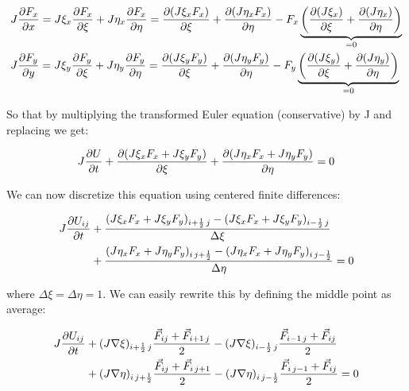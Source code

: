 \begin{equation}
\begin{aligned}
&J\frac{\partial F_x}{\partial x} = J\xi _x\frac{\partial F_x}{\partial \xi} + J\eta _x\frac{\partial F_x}{\partial \eta} = \frac{\partial (J\xi _x F_x)}{\partial \xi} + \frac{\partial (J\eta _xF_x)}{\partial \eta} - F_x\underbrace{ \left( \frac{\partial (J\xi _x)}{\partial \xi} + \frac{\partial (J\eta _x)}{\partial \eta} \right)}_{=0}
\\
&J\frac{\partial F_y}{\partial y} = J\xi _y\frac{\partial F_y}{\partial \xi} + J\eta _y\frac{\partial F_y}{\partial \eta} = \frac{\partial (J\xi _y F_y)}{\partial \xi} + \frac{\partial (J\eta _yF_y)}{\partial \eta} - F_y\underbrace{ \left( \frac{\partial (J\xi _y)}{\partial \xi} + \frac{\partial (J\eta _y)}{\partial \eta} \right)}_{=0}
\end{aligned}
\end{equation}

So that by multiplying the transformed Euler equation (conservative) by J and replacing we get: 

\begin{equation}
J\frac{\partial U}{\partial t} + \frac{\partial (J\xi _x F_x + J\xi _y F_y)}{\partial \xi} + \frac{\partial (J\eta _xF_x + J\eta _yF_y)}{\partial \eta} = 0
\end{equation}

We can now discretize this equation using centered finite differences: 

\begin{equation}
\begin{aligned}
J\frac{\partial U_{ij}}{\partial t} &+ \frac{(J\xi _x F_x + J\xi _y F_y)_{i+\frac{1}{2}\, j}-(J\xi _x F_x + J\xi _y F_y)_{i-\frac{1}{2}\, j}}{\Delta \xi}\\ 
&+ \frac{(J\eta _xF_x + J\eta _yF_y)_{i\, j+\frac{1}{2}} - (J\eta _xF_x + J\eta _yF_y)_{i\, j-\frac{1}{2}}}{\Delta \eta} = 0
\end{aligned}
\end{equation}

where $\Delta \xi = \Delta \eta = 1$. We can easily rewrite this by defining the middle point as average: 

\begin{equation}
\begin{aligned}
J\frac{\partial U_{ij}}{\partial t} &+ (J \nabla \xi)_{i+\frac{1}{2}\, j} \frac{\vec{F}_{ij}+ \vec{F}_{i+1\, j}}{2} - (J \nabla \xi)_{i-\frac{1}{2}\, j} \frac{\vec{F}_{i-1 \, j}+ \vec{F}_{ij}}{2} \\
&+ (J \nabla \eta)_{i \, j + \frac{1}{2}} \frac{\vec{F}_{ij}+ \vec{F}_{i\, j + 1}}{2}
- (J \nabla \eta)_{i \, j -\frac{1}{2}} \frac{\vec{F}_{i\, j-1}+ \vec{F}_{ij}}{2} = 0
\end{aligned}
\end{equation}

